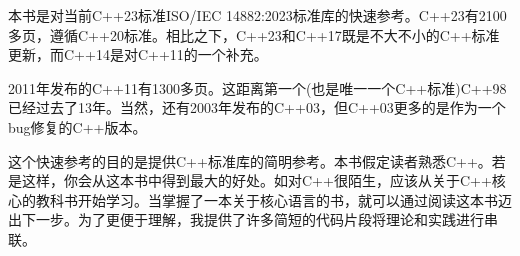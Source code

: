 本书是对当前C++23标准ISO/IEC 14882:2023标准库的快速参考。C++23有2100多页，遵循C++20标准。相比之下，C++23和C++17既是不大不小的C++标准更新，而C++14是对C++11的一个补充。

2011年发布的C++11有1300多页。这距离第一个(也是唯一一个C++标准)C++98已经过去了13年。当然，还有2003年发布的C++03，但C++03更多的是作为一个bug修复的C++版本。

这个快速参考的目的是提供C++标准库的简明参考。本书假定读者熟悉C++。若是这样，你会从这本书中得到最大的好处。如对C++很陌生，应该从关于C++核心的教科书开始学习。当掌握了一本关于核心语言的书，就可以通过阅读这本书迈出下一步。为了更便于理解，我提供了许多简短的代码片段将理论和实践进行串联。